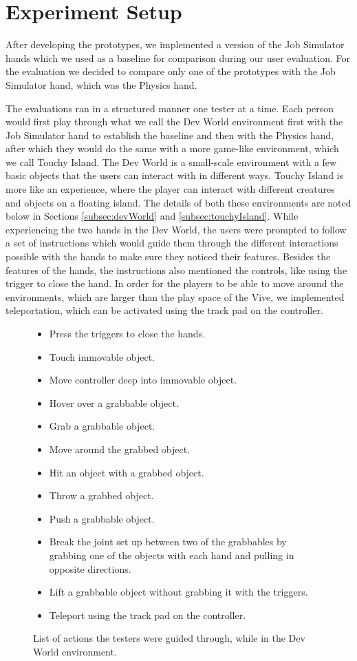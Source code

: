 \section{Experiment Setup}
\label{sec:experimentSetup}
After developing the prototypes, we implemented a version of the Job Simulator hands which we used as a baseline for comparison during our user evaluation. For the evaluation we decided to compare only one of the prototypes with the Job Simulator hand, which was the Physics hand.

The evaluations ran in a structured manner one tester at a time. Each person would first play through what we call the Dev World environment first with the Job Simulator hand to establish the baseline and then with the Physics hand, after which they would do the same with a more game-like environment, which we call Touchy Island. The Dev World is a small-scale environment with a few basic objects that the users can interact with in different ways. Touchy Island is more like an experience, where the player can interact with different creatures and objects on a floating island. The details of both these environments are noted below in Sections \ref{subsec:devWorld} and \ref{subsec:touchyIsland}. While experiencing the two hands in the Dev World, the users were prompted to follow a set of instructions which would guide them through the different interactions possible with the hands to make sure they noticed their features. Besides the features of the hands, the instructions also mentioned the controls, like using the trigger to close the hand. In order for the players to be able to move around the environments, which are larger than the play space of the Vive, we  implemented teleportation, which can be activated using the track pad on the controller.

\begin{figure}
\begin{itemize}[noitemsep]
\item Press the triggers to close the hands.
\item Touch immovable object.
\item Move controller deep into immovable object.
\item Hover over a grabbable object.
\item Grab a grabbable object.
\item Move around the grabbed object.
\item Hit an object with a grabbed object.
\item Throw a grabbed object.
\item Push a grabbable object.
\item Break the joint set up between two of the grabbables by grabbing one of the objects with each hand and pulling in opposite directions.
\item Lift a grabbable object without grabbing it with the triggers.
\item Teleport using the track pad on the controller.
\end{itemize}
\caption{List of actions the testers were guided through, while in the Dev World environment.}
\label{fig:listActionsDevWorld}
\end{figure}

